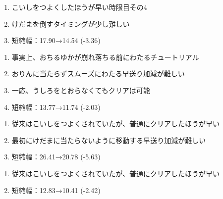 \clearpage
\begin{enumerate}[label={\sarrow}]
\item こいしをつよくしたほうが早い時限目その4
\item けだまを倒すタイミングが少し難しい
\item 短縮幅：17.90→14.54 (-3.36)
\end{enumerate}



\begin{enumerate}[label={\sarrow}]
\item 事実上、おちるゆかが崩れ落ちる前にわたるチュートリアル
\item おりんに当たらずスムーズにわたる早送り加減が難しい
\item 一応、うしろをとおらなくてもクリアは可能
\item 短縮幅：13.77→11.74 (-2.03)
\end{enumerate}



\begin{enumerate}[label={\sarrow}]
\item 従来はこいしをつよくされていたが、普通にクリアしたほうが早い
\item 最初にけだまに当たらないように移動する早送り加減が難しい
\item 短縮幅：26.41→20.78 (-5.63)
\end{enumerate}



\begin{enumerate}[label={\sarrow}]
\item 従来はこいしをつよくされていたが、普通にクリアしたほうが早い
\item 短縮幅：12.83→10.41 (-2.42)
\end{enumerate}



